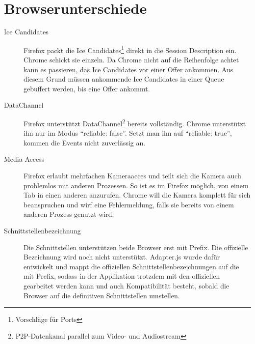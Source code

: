 	\section{Browserunterschiede}
		\begin{description}
			\item[Ice Candidates] Firefox packt die Ice Candidates\footnote{Vorschläge für Ports} direkt in die Session Description ein. Chrome schickt sie einzeln. Da Chrome nicht auf die Reihenfolge achtet kann es passieren, das Ice Candidates vor einer Offer ankommen. Aus diesem Grund müssen ankommende Ice Candidates in einer Queue gebuffert werden, bis eine Offer ankommt.
		
			\item[DataChannel] Firefox unterstützt DataChannel\footnote{P2P-Datenkanal parallel zum Video-
			und Audiostream} bereits vollständig. Chrome unterstützt ihn nur im Modus
			"`reliable: false"'. Setzt man ihn auf "`reliable: true"', kommen die Events
			nicht zuverlässig an.
			
			\item[Media Access] Firefox erlaubt mehrfachen Kameraacces und teilt sich die Kamera auch problemlos mit anderen Prozessen. So ist es im Firefox möglich, von einem Tab in einen anderen anzurufen. Chrome will die Kamera komplett für sich beanspruchen und wirf eine Fehlermeldung, falls sie bereits von einem anderen Prozess genutzt wird.
			
			\item[Schnittstellenbezeichnung] Die Schnittstellen unterstützen beide Browser erst mit Prefix. Die offizielle Bezeichnung wird noch nicht unterstützt. Adapter.js wurde dafür entwickelt und mappt die offiziellen Schnittstellenbezeichnungen auf die mit Prefix, sodass in der Applikation trotzdem mit den offiziellen gearbeitet werden kann und auch Kompatibilität besteht, sobald die Browser auf die definitiven Schnittstellen umstellen.
	 	\end{description}